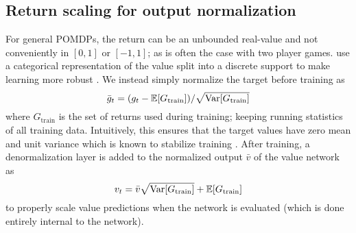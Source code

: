 \subsection*{Return scaling for output normalization}

For general POMDPs, the return can be an unbounded real-value and not conveniently in $[0,1]$ or $[-1,1]$; as is often the case with two player games. 
\citeauthor{schrittwieser2020mastering} use a categorical representation of the value split into a discrete support to make learning more robust \cite{schrittwieser2020intuition}.
We instead simply normalize the target before training as
\begin{equation}
    \bar{g}_t = (g_t - \mathbb{E}[G_\text{train}])/\sqrt{\Var[G_\text{train}]} %
\end{equation}
where $G_\text{train}$ is the set of returns used during training; keeping running statistics of all training data.
Intuitively, this ensures that the target values have zero mean and unit variance which is known to stabilize training \cite{lecun2002efficient}.
After training, a denormalization layer is added to the normalized output $\bar{v}$ of the value network as
\begin{equation}
    v_t = \bar{v} \sqrt{\operatorname{Var}[G_\text{train}]} + \mathbb{E}[G_\text{train}]
\end{equation}
to properly scale value predictions when the network is evaluated (which is done entirely internal to the network).



